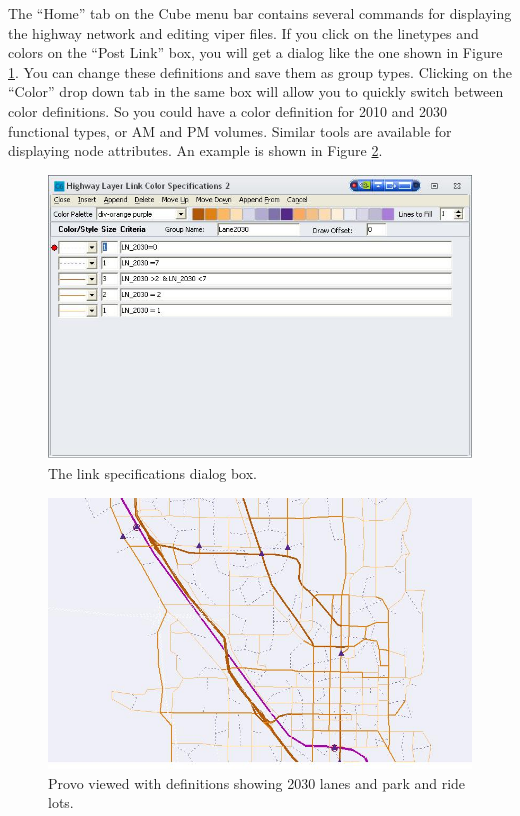 The ``Home'' tab on the Cube menu bar contains several commands for displaying
the highway network and editing viper files. If you click on the linetypes and
colors on the ``Post Link'' box, you will get a dialog like the one shown in
Figure \ref{fig:linetypes}. You can change these definitions and save them as
group types. Clicking on the ``Color'' drop down tab in the same box will
allow you to quickly switch between color definitions. So you could have a
color definition for 2010 and 2030 functional types, or AM and PM volumes.
Similar tools are available for displaying node attributes. An example is
shown in Figure \ref{fig:2030vpr}.

\begin{figure}[t]
\centering
\includegraphics[width=\textwidth]{linetypes.JPG}
	\caption{The link specifications dialog box.}
	\label{fig:linetypes}
\end{figure}

\begin{figure}[t]
\centering
\includegraphics[width=\textwidth]{2030.JPG}
	\caption{Provo viewed with definitions showing 2030 lanes and park and ride
			lots.}
	\label{fig:2030vpr}
\end{figure}

